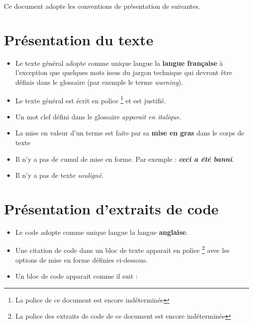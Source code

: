 Ce document adopte les conventions de présentation de suivantes. \medskip

\section{Présentation du texte}

\begin{itemize}
\item Le texte général adopte comme unique langue la \textbf{langue française} à l’exception que quelques mots issus du jargon technique qui devront être définis dans le glossaire (par exemple le terme \textit{warning}).
\item Le texte général est écrit en police \footnote{La police de ce document est encore indéterminée} et est justifié.
\item Un mot clef défini dans le glossaire \textit{apparait en italique}.
\item La mise en valeur d’un terme est faite par sa \textbf{mise en gras} dans le corps de texte
\item Il n’y a pas de cumul de mise en forme. Par exemple : \textbf{\textit{ceci a été banni}}.
\item Il n’y a pas de texte \textsl{souligné}.
\end{itemize}
\bigskip

\section{Présentation d'extraits de code}

\begin{itemize}
\item Le code adopte comme unique langue la langue \textbf{anglaise}.
\item Une citation de code dans un bloc de texte apparait en police \footnote{La police des extraits de code de ce document est encore indéterminée} avec les options de mise en forme définies ci-dessous.
\item Un bloc de code apparait comme il suit :
\end{itemize}


\bigskip

